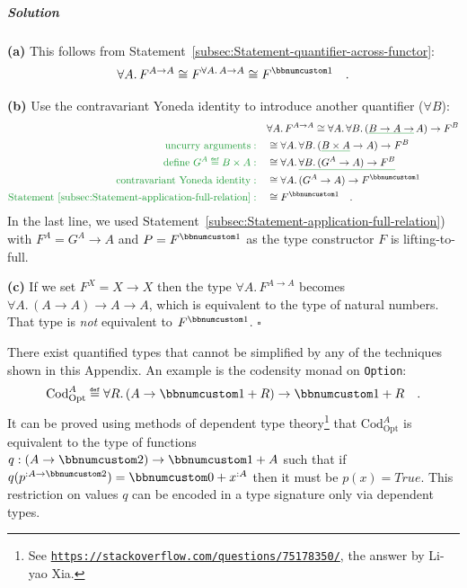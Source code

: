 \subparagraph{Solution}

\textbf{(a)} This follows from Statement~\ref{subsec:Statement-quantifier-across-functor}:
\[
\forall A.\,F^{A\rightarrow A}\cong F^{\forall A.\,A\rightarrow A}\cong F^{\bbnum 1}\quad.
\]

\textbf{(b)} Use the contravariant Yoneda identity to introduce another
quantifier ($\forall B$):
\begin{align*}
 & \forall A.\,F^{A\rightarrow A}\cong\forall A.\,\forall B.\,(\gunderline{B\rightarrow A\rightarrow}\,A)\rightarrow F^{B}\\
{\color{greenunder}\text{uncurry arguments}:}\quad & \cong\forall A.\,\forall B.\,(\gunderline{B\times A}\rightarrow A)\rightarrow F^{B}\\
{\color{greenunder}\text{define }G^{A}\triangleq B\times A:}\quad & \cong\forall A.\,\gunderline{\forall B.\,(G^{A}\rightarrow A)\rightarrow F^{B}}\\
{\color{greenunder}\text{contravariant Yoneda identity}:}\quad & \cong\forall A.\,(G^{A}\rightarrow A)\rightarrow F^{\bbnum 1}\\
{\color{greenunder}\text{Statement \ref{subsec:Statement-application-full-relation}}:}\quad & \cong F^{\bbnum 1}\quad.
\end{align*}
In the last line, we used Statement~\ref{subsec:Statement-application-full-relation})
with $F^{A}=G^{A}\rightarrow A$ and $P=F^{\bbnum 1}$ as the type
constructor $F$ is lifting-to-full.

\textbf{(c)} If we set $F^{X}=X\rightarrow X$ then the type $\forall A.\,F^{A\rightarrow A}$
becomes $\forall A.\,(A\rightarrow A)\rightarrow A\rightarrow A$,
which is equivalent to the type of natural numbers. That type is \emph{not}
equivalent to $F^{\bbnum 1}$. $\square$

There exist quantified types that cannot be simplified by any of the
techniques shown in this Appendix. An example is the codensity monad
on \lstinline!Option!:
\[
\text{Cod}_{\text{Opt}}^{A}\triangleq\forall R.\,(A\rightarrow\bbnum 1+R)\rightarrow\bbnum 1+R\quad.
\]
It can be proved using methods of dependent type theory\footnote{See \texttt{\href{https://stackoverflow.com/questions/75178350/}{https://stackoverflow.com/questions/75178350/}},
the answer by Li-yao Xia.} that $\text{Cod}_{\text{Opt}}^{A}$ is equivalent to the type of
functions $q:(A\rightarrow\bbnum 2)\rightarrow\bbnum 1+A$ such that
if $q(p^{:A\rightarrow\bbnum 2})=\bbnum 0+x^{:A}$ then it must be
$p(x)=True$. This restriction on values $q$ can be encoded in a
type signature only via dependent types.


